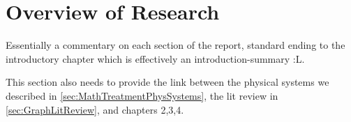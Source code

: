 \section{Overview of Research} \label{sec:ReportOverview}
Essentially a commentary on each section of the report, standard ending to the introductory chapter which is effectively an introduction-summary :L.

This section also needs to provide the link between the physical systems we described in \ref{sec:MathTreatmentPhysSystems}, the lit review in \ref{sec:GraphLitReview}, and chapters 2,3,4.